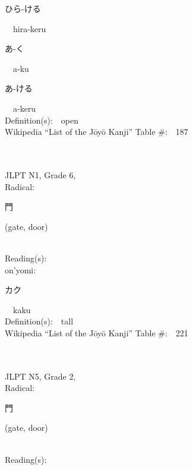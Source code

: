 \begin{multicols}{2}
{\hspace*{2em}}{\begin{CJK}{UTF8}{min} ひら-ける \end{CJK}}\ \ hira-keru\ \ \\
{\hspace*{2em}}{\begin{CJK}{UTF8}{min} あ-く \end{CJK}}\ \ a-ku\ \ \\
{\hspace*{2em}}{\begin{CJK}{UTF8}{min} あ-ける \end{CJK}}\ \ a-keru\ \ \\
Definition(s):\ \ open \\
Wikipedia ``List of the J\=oy\=o Kanji'' Table \#:\ \ 187 \\
\ \ \\
{\fontsize{34pt}{40pt}  }\ \ \\  %
{JLPT N1, Grade 6, \\Radical:\ \ {\begin{CJK}{UTF8}{min} 門 \end{CJK}} (gate, door) } \\
Reading(s):\ \ \\
{\hspace*{1em}}on'yomi:\ \ \\
{\hspace*{2em}}{\begin{CJK}{UTF8}{min} カク \end{CJK}}\ \ kaku\ \ \\
Definition(s):\ \ tall \\
Wikipedia ``List of the J\=oy\=o Kanji'' Table \#:\ \ 221 \\
\ \ \\
{\fontsize{34pt}{40pt}  }\ \ \\  %
{JLPT N5, Grade 2, \\Radical:\ \ {\begin{CJK}{UTF8}{min} 門 \end{CJK}} (gate, door) } \\
Reading(s):\ \ \\

\end{multicols}

